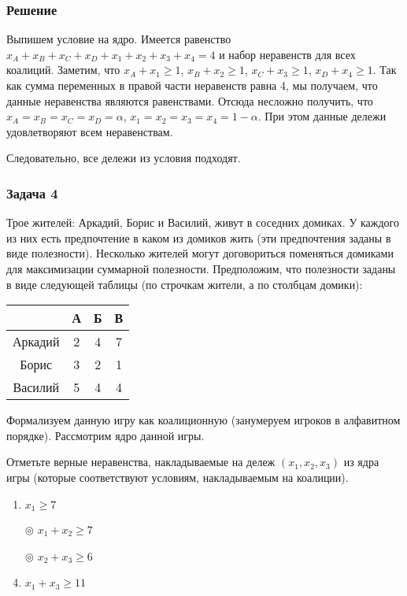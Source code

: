 	\subsubsection*{Решение}
	Выпишем условие на ядро. Имеется равенство $x_{A}+x_{B}+x_{C}+x_{D}+x_{1}+x_2+x_3+x_4=4$ и набор неравенств для всех коалиций. Заметим, что $x_{A}+x_1\geq 1$, $x_B+x_2 \geq 1$, $x_C+x_3\geq 1$, $x_D+x_4\geq 1$. Так как сумма переменных в правой части неравенств равна 4, мы получаем, что данные неравенства являются равенствами. Отсюда несложно получить, что $x_A=x_B=x_C=x_D=\alpha$, $x_1=x_2=x_3=x_4=1-\alpha$. При этом данные дележи удовлетворяют всем неравенствам.
	
	Следовательно, все дележи из условия подходят.

	\subsubsection{Задача 4}
	\label{sec4}
	Трое жителей: Аркадий, Борис и Василий, живут в соседних домиках. У каждого из них есть предпочтение в каком из домиков жить (эти предпочтения заданы в виде полезности). Несколько жителей могут договориться поменяться домиками для максимизации суммарной полезности. Предположим, что полезности заданы в виде следующей таблицы (по строчкам жители, а по столбцам домики):
	
	\begin{table}[h]
		\label{prob4:table1}
		\centering
		\begin{tabular}{|c|c|c|c|}
			\hline & А & Б & В \\ 	
			\hline Аркадий & 2 & 4 & 7 \\ 
			\hline Борис & 3 & 2 & 1 \\ 
			\hline Василий & 5 & 4 & 4 \\ 
			\hline 
		\end{tabular} 
	\end{table}
	
	Формализуем данную игру как коалиционную (занумеруем игроков в алфавитном порядке). Рассмотрим ядро данной игры.
	
	Отметьте верные неравенства, накладываемые на дележ $(x_1,x_2,x_3)$ из ядра игры (которые соответствуют условиям, накладываемым на коалиции).
	
	\begin{enumerate}[label=$\circ$]
		\item $x_1 \geq 7$
		\item[$\circledcirc$] $x_1 + x_2 \geq 7$
		\item[$\circledcirc$] $x_2 + x_3 \geq 6$
		\item $x_1 + x_3 \geq 11$
	\end{enumerate}

